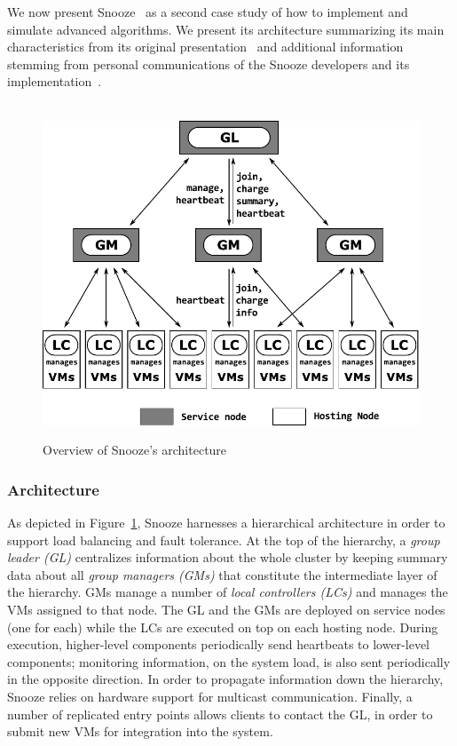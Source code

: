 We now present Snooze~\cite{feller:ccgrid12} as a second case study of how
to implement and simulate advanced algorithms.
We present its architecture summarizing its main
characteristics from its original presentation~\cite{feller:ccgrid12} and
additional information  stemming from personal communications of the Snooze
developers and its implementation~\cite{snoozeweb,snoozedev14}.
\begin{figure}
  {\centering ~\includegraphics[width=.95\linewidth]{figures/snoozearch.pdf}}
  \caption{Overview of Snooze's architecture}
  \label{fig:snoozearch}
\end{figure}

\subsubsection{Architecture}
\label{sec:snoozeArchi}

As depicted in  Figure~\ref{fig:snoozearch}, Snooze harnesses a hierarchical architecture in order to support load
balancing and fault tolerance. At the
top of the hierarchy, a \emph{group leader (GL)} centralizes information about the
whole cluster by keeping summary data about all \emph{group
  managers (GMs)} that constitute the intermediate layer of the
hierarchy. GMs manage a
number of \emph{local controllers (LCs)} and manages the VMs assigned
to that node.
The GL and the GMs are deployed on service nodes (one for each) while
the LCs are executed on top on each hosting node.
During execution, higher-level components periodically send heartbeats to lower-level
components; monitoring information, \eg on the system load, is also
sent periodically in the opposite direction. In order to propagate
information down the hierarchy, Snooze relies on hardware support for
multicast communication. Finally, a number of replicated entry points
allows clients to contact the GL, \eg in order to submit new VMs for
integration into the system.

